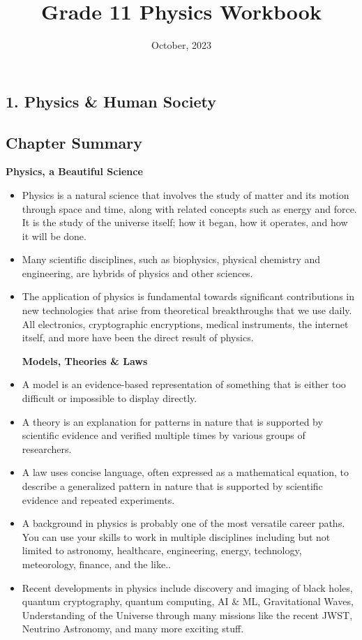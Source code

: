 \documentclass[12pt,addpoints]{exam}
\date{October, 2023}
\begin{document}
	\title{Grade 11 Physics Workbook}
	\maketitle
	
	\begin{center}
		\section*{1. Physics \& Human Society}
		\subsection*{Chapter Summary}
		\textbf{Physics, a Beautiful Science} 
	\end{center}
		
	\begin{itemize}
		\item Physics is a natural science that involves the study of matter and its motion through space and time, along with related concepts such as energy and force. It is the study of the universe itself; how it began, how it operates, and how it will be done.
		\item Many scientific disciplines, such as biophysics, physical chemistry and engineering, are hybrids of physics and other sciences.
		\item The application of physics is fundamental towards significant contributions in new technologies that arise from theoretical breakthroughs that we use daily. All electronics, cryptographic encryptions, medical instruments, the internet itself, and more have been the direct result of physics.
		\begin{center}
			\textbf{Models, Theories \& Laws} 
		\end{center} 
		\item A model is an evidence-based representation of something that is either too difficult or impossible to display directly.
		\item A theory is an explanation for patterns in nature that is supported by scientific evidence and verified multiple times by various groups of researchers.
		\item A law uses concise language, often expressed as a mathematical equation, to describe a generalized pattern in nature that is supported by scientific evidence and repeated experiments.
		\item A background in physics is probably one of the most versatile career paths. You can use your skills to work in multiple disciplines including but not limited to  astronomy, healthcare, engineering, energy, technology, meteorology, finance, and the like..
		\item Recent developments in physics include discovery and imaging of black holes, quantum cryptography, quantum computing, AI \& ML, Gravitational Waves, Understanding of the Universe through many missions like the recent JWST, Neutrino Astronomy, and many more exciting stuff. 
\end{itemize}	
\end{document}
